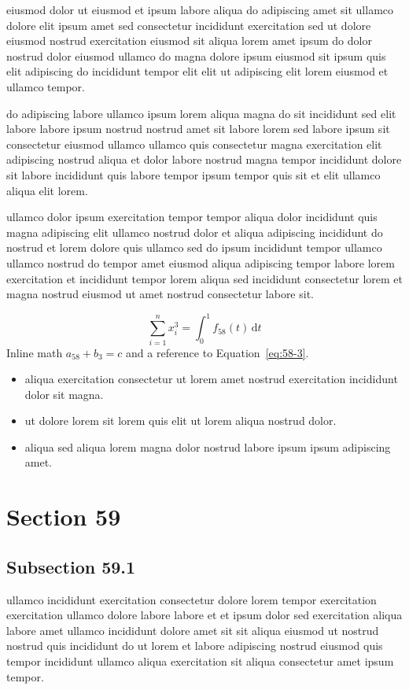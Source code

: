\documentclass{article}
\begin{document}
eiusmod dolor ut eiusmod et ipsum labore aliqua do adipiscing amet sit ullamco dolore elit ipsum amet sed consectetur incididunt exercitation sed ut dolore eiusmod nostrud exercitation eiusmod sit aliqua lorem amet ipsum do dolor nostrud dolor eiusmod ullamco do magna dolore ipsum eiusmod sit ipsum quis elit adipiscing do incididunt tempor elit elit ut adipiscing elit lorem eiusmod et ullamco tempor.

do adipiscing labore ullamco ipsum lorem aliqua magna do sit incididunt sed elit labore labore ipsum nostrud nostrud amet sit labore lorem sed labore ipsum sit consectetur eiusmod ullamco ullamco quis consectetur magna exercitation elit adipiscing nostrud aliqua et dolor labore nostrud magna tempor incididunt dolore sit labore incididunt quis labore tempor ipsum tempor quis sit et elit ullamco aliqua elit lorem.

ullamco dolor ipsum exercitation tempor tempor aliqua dolor incididunt quis magna adipiscing elit ullamco nostrud dolor et aliqua adipiscing incididunt do nostrud et lorem dolore quis ullamco sed do ipsum incididunt tempor ullamco ullamco nostrud do tempor amet eiusmod aliqua adipiscing tempor labore lorem exercitation et incididunt tempor lorem aliqua sed incididunt consectetur lorem et magna nostrud eiusmod ut amet nostrud consectetur labore sit.

\begin{equation}\label{eq:58-3}
  \sum_{i=1}^{n} x_i^{3} = \int_0^1 f_{58}(t)\,\mathrm{d}t
\end{equation}
Inline math $a_{58} + b_{3} = c$ and a reference to Equation~\eqref{eq:58-3}.

\begin{itemize}
  \item aliqua exercitation consectetur ut lorem amet nostrud exercitation incididunt dolor sit magna.
  \item ut dolore lorem sit lorem quis elit ut lorem aliqua nostrud dolor.
  \item aliqua sed aliqua lorem magna dolor nostrud labore ipsum ipsum adipiscing amet.
\end{itemize}

\section{Section 59}\label{sec:59}
\subsection{Subsection 59.1}\label{sec:59-1}
ullamco incididunt exercitation consectetur dolore lorem tempor exercitation exercitation ullamco dolore labore labore et et ipsum dolor sed exercitation aliqua labore amet ullamco incididunt dolore amet sit sit aliqua eiusmod ut nostrud nostrud quis incididunt do ut lorem et labore adipiscing nostrud eiusmod quis tempor incididunt ullamco aliqua exercitation sit aliqua consectetur amet ipsum tempor.
\end{document}
